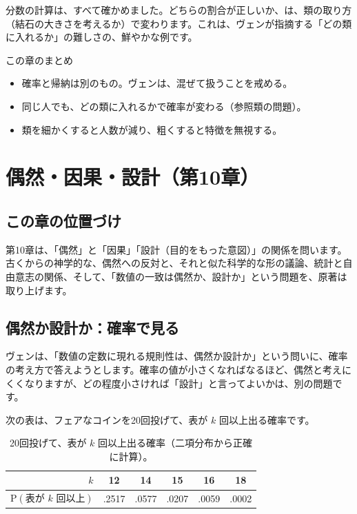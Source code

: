 \documentclass[a4paper,11pt,openany]{ltjsbook}
\newcommand{\Prob}{\mathrm{P}}
\begin{document}
分数の計算は、すべて確かめました。どちらの割合が正しいか、は、類の取り方（結石の大きさを考えるか）で変わります。これは、ヴェンが指摘する「どの類に入れるか」の難しさの、鮮やかな例です。

\begin{pointbox}{この章のまとめ}
\begin{itemize}[leftmargin=*]
\item 確率と帰納は別のもの。ヴェンは、混ぜて扱うことを戒める。
\item 同じ人でも、どの類に入れるかで確率が変わる（参照類の問題）。
\item 類を細かくすると人数が減り、粗くすると特徴を無視する。
\end{itemize}
\end{pointbox}

\chapter{偶然・因果・設計（第10章）}

\section{この章の位置づけ}

第10章は、「偶然」と「因果」「設計（目的をもった意図）」の関係を問います。古くからの神学的な、偶然への反対と、それと似た科学的な形の議論、統計と自由意志の関係、そして、「数値の一致は偶然か、設計か」という問題を、原著は取り上げます。

\section{偶然か設計か：確率で見る}

ヴェンは、「数値の定数に現れる規則性は、偶然か設計か」という問いに、確率の考え方で答えようとします。確率の値が小さくなればなるほど、偶然と考えにくくなりますが、どの程度小さければ「設計」と言ってよいかは、別の問題です。

次の表は、フェアなコインを20回投げて、表が $k$ 回以上出る確率です。

\begin{table}[htbp]
\centering
\begin{tabular}{r|ccccc}
\toprule
$k$ & 12 & 14 & 15 & 16 & 18\\
\midrule
$\Prob(\text{表が }k\text{ 回以上})$ & .2517 & .0577 & .0207 & .0059 & .0002\\
\bottomrule
\end{tabular}
\caption{20回投げて、表が $k$ 回以上出る確率（二項分布から正確に計算）。}
\end{table}
\end{document}

